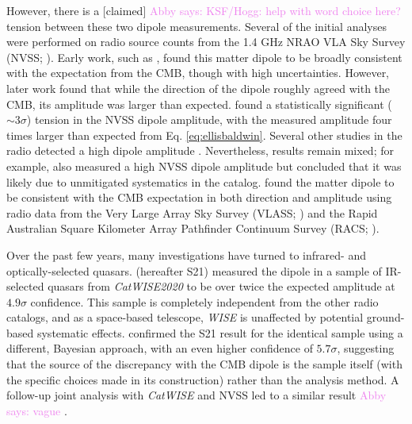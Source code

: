 \documentclass[modern]{aastex631}
\newcommand{\abby}[1]{\textcolor{violet}{Abby says: #1}}
\newcommand{\catwise}{\textsl{CatWISE}\xspace}
\newcommand{\catwisetwentytwenty}{\textsl{CatWISE2020}\xspace}
\begin{document}
However, there is a [claimed] \abby{KSF/Hogg: help with word choice here?} tension between these two dipole measurements.
Several of the initial analyses were performed on radio source counts from the 1.4 GHz NRAO VLA Sky Survey (NVSS; \citealt{condon_nrao_1998}).
Early work, such as \citet{blake_detection_2002}, found this matter dipole to be broadly consistent with the expectation from the CMB, though with high uncertainties.
However, later work found that while the direction of the dipole roughly agreed with the CMB, its amplitude was larger than expected.
\citet{singal_large_2011} found a statistically significant ($\sim3\sigma$) tension in the NVSS dipole amplitude, with the measured amplitude four times larger than expected from Eq. \ref{eq:ellisbaldwin}.
Several other studies in the radio detected a high dipole amplitude \citep{rubart_cosmic_2013, tiwari_dipole_2015, colin_high_2017, bengaly_probing_2018}.
Nevertheless, results remain mixed; for example, \citet{gibelyou_dipoles_2012} also measured a high NVSS dipole amplitude but concluded that it was likely due to unmitigated systematics in the catalog.
\citet{darling_universe_2022} found the matter dipole to be consistent with the CMB expectation in both direction and amplitude using radio data from the Very Large Array Sky Survey (VLASS; \citealt{lacy_karl_2020}) and the Rapid
Australian Square Kilometer Array Pathfinder Continuum
Survey (RACS; \citealt{mcconnell_rapid_2020}).

Over the past few years, many investigations have turned to infrared- and optically-selected quasars.
\citet{secrest_test_2021} (hereafter S21) measured the dipole in a sample of IR-selected quasars from \catwisetwentytwenty to be over twice the expected amplitude at $4.9\sigma$ confidence.
This sample is completely independent from the other radio catalogs, and as a space-based telescope, \textit{WISE} is unaffected by potential ground-based systematic effects.
\citet{dam_testing_2022} confirmed the S21 result for the identical sample using a different, Bayesian approach, with an even higher confidence of $5.7\sigma$, suggesting that the source of the discrepancy with the CMB dipole is the sample itself (with the specific choices made in its construction) rather than the analysis method.
A follow-up joint analysis with \catwise and NVSS led to a similar result \abby{vague} \citep{secrest_challenge_2022}.

\end{document}
